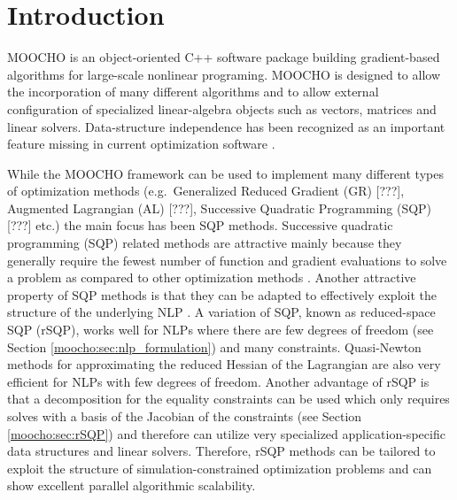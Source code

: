\documentclass[pdf,ps2pdf,11pt]{SANDreport}
\begin{document}
%
\section{Introduction}
%

MOOCHO is an object-oriented C++ software package building gradient-based
algorithms for large-scale nonlinear programing.  MOOCHO is designed to allow
the incorporation of many different algorithms and to allow external
configuration of specialized linear-algebra objects such as vectors, matrices
and linear solvers.  Data-structure independence has been recognized as an
important feature missing in current optimization software
\cite{ref:wright_1999}.

While the MOOCHO framework can be used to implement many different types of
optimization methods (e.g.~Generalized Reduced Gradient (GR) [???], Augmented
Lagrangian (AL) [???], Successive Quadratic Programming (SQP) [???] etc.) the
main focus has been SQP methods.  Successive quadratic programming (SQP)
related methods are attractive mainly because they generally require the
fewest number of function and gradient evaluations to solve a problem as
compared to other optimization methods {}\cite{ref:schmid_accel_1993}.
Another attractive property of SQP methods is that they can be adapted to
effectively exploit the structure of the underlying NLP
{}\cite{ref:varvarezos_1994}.  A variation of SQP, known as reduced-space SQP
(rSQP), works well for NLPs where there are few degrees of freedom (see
Section {}\ref{moocho:sec:nlp_formulation}) and many constraints.
Quasi-Newton methods for approximating the reduced Hessian of the Lagrangian
are also very efficient for NLPs with few degrees of freedom.  Another
advantage of rSQP is that a decomposition for the equality constraints can be
used which only requires solves with a basis of the Jacobian of the
constraints (see Section \ref{moocho:sec:rSQP}) and therefore can utilize very
specialized application-specific data structures and linear solvers.
Therefore, rSQP methods can be tailored to exploit the structure of
simulation-constrained optimization problems and can show excellent parallel
algorithmic scalability.
\end{document}
